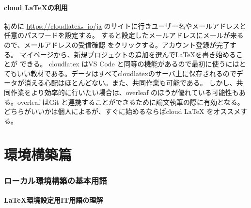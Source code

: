 \documentclass{ltjsarticle}
\begin{document}
\subsection{cloud \LaTeX の利用}
初めに
\url{https://cloudlatex。io/ja}
のサイトに行きユーザー名やメールアドレスと任意のパスワードを設定する。
すると設定したメールアドレスにメールが来るので、メールアドレスの受信確認
をクリックする。アカウント登録が完了する。
マイページから、新規プロジェクトの追加を選んで\LaTeX を書き始めることが
できる。
cloudlatex はVS Code と同等の機能があるので最初に使うにはとてもいい教材である。データはすべてcloudlatexのサーバ上に保存されるのでデータが消える心配はほとんどない。また、共同作業も可能である。
しかし、共同作業をより効率的に行いたい場合は、overleaf のほうが優れている可能性もある。overleaf はGit と連携することができるために論文執筆の際に有効となる。どちらがいいかは個人によるが、すぐに始めるならばcloud LaTeX をオススメする。
\part{環境構築篇}
\section{ローカル環境構築の基本用語}
\subsection{\LaTeX 環境設定用IT用語の理解}
\end{document}
